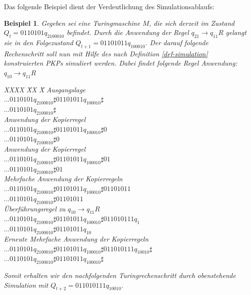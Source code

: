 \documentclass[]{scrartcl}
\newtheorem{bsp}[definition]{Beispiel}
\begin{document}
			Das folgende Beispiel dient der Verdeutlichung des Simulationsablaufs:
			\begin{bsp}
				Gegeben sei eine Turingmaschine $M$, die sich derzeit im Zustand $Q_t = 0110101q_2100010$ befindet. Durch die Anwendung der Regel $q_21 \rightarrow q_11R$ gelangt sie in den Folgezustand $Q_{t+1} = 01101011q_100010$. Der darauf folgende Rechenschritt soll nun mit Hilfe des nach Definition \ref{def-simulation} konstruierten PKPs simuliert werden. Dabei findet folgende Regel Anwendung: $q_10\rightarrow q_11R$
				\begin{tabbing}
				XXXX \= XX \= X\kill
				\>\textbullet Ausgangslage\\
				\>\> $...0110101q_2100010\sharp01101011q_100010\sharp$\\
				\>\> $...0110101q_2100010\sharp$\\
				\>\textbullet Anwendung der Kopierregel\\
				\>\> $...0110101q_2100010\sharp01101011q_100010\sharp0$\\
				\>\>$ ...0110101q_2100010\sharp0$\\
				\>\textbullet Anwendung der Kopierregel\\
				\>\> $...0110101q_2100010\sharp01101011q_100010\sharp01$\\
				\>\>$ ...0110101q_2100010\sharp01$\\
				\>\textbullet Mehrfache Anwendung der Kopierregeln\\
				\>\> $...0110101q_2100010\sharp01101011q_100010\sharp01101011$\\
				\>\>$ ...0110101q_2100010\sharp01101011$\\
				\>\textbullet Überführungsregel zu $q_10\rightarrow q_11R$\\
				\>\> $...0110101q_2100010\sharp01101011q_100010\sharp011010111q_1$\\
				\>\>$ ...0110101q_2100010\sharp01101011q_10$\\
				\>\textbullet Erneute Mehrfache Anwendung der Kopierregeln\\
				\>\> $...0110101q_2100010\sharp01101011q_100010\sharp011010111q_10010\sharp$\\
				\>\>$ ...0110101q_2100010\sharp01101011q_100010\sharp$\\
				\end{tabbing}
				Somit erhalten wir den nachfolgenden Turingrechenschritt durch obenstehende Simulation mit $Q_{t+2} = 011010111q_10010$.
			\end{bsp}
\end{document}
